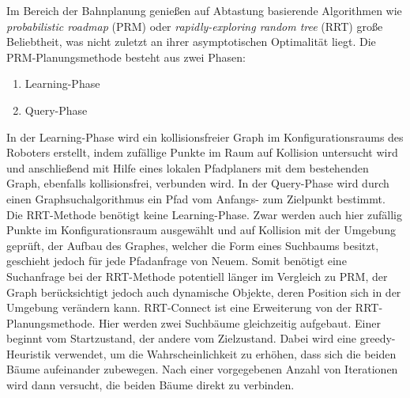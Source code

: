 Im Bereich der Bahnplanung genießen auf Abtastung basierende Algorithmen wie \textit{probabilistic roadmap} (PRM) oder \textit{rapidly-exploring random tree} (RRT) große Beliebtheit, was nicht zuletzt an ihrer asymptotischen Optimalität \cite{SamplingAlgos} liegt.
\newline
Die PRM-Planungsmethode \cite{PRM} besteht aus zwei Phasen:
\begin{enumerate}
	\item Learning-Phase
	\item Query-Phase
\end{enumerate}
In der Learning-Phase wird ein kollisionsfreier Graph im Konfigurationsraums des Roboters erstellt, indem zufällige Punkte im Raum auf Kollision untersucht wird und anschließend mit Hilfe eines lokalen Pfadplaners mit dem bestehenden Graph, ebenfalls kollisionsfrei, verbunden wird. In der Query-Phase wird durch einen Graphsuchalgorithmus ein Pfad vom Anfangs- zum Zielpunkt bestimmt.
\newline
Die RRT-Methode \cite{RRT} benötigt keine Learning-Phase. Zwar werden auch hier zufällig Punkte im Konfigurationsraum ausgewählt und auf Kollision mit der Umgebung geprüft, der Aufbau des Graphes, welcher die Form eines Suchbaums besitzt, geschieht jedoch für jede Pfadanfrage von Neuem. Somit benötigt eine Suchanfrage bei der RRT-Methode potentiell länger im Vergleich zu PRM, der Graph berücksichtigt jedoch auch dynamische Objekte, deren Position sich in der Umgebung verändern kann.
\newline
RRT-Connect \cite{RRTConnect} ist eine Erweiterung von der RRT-Planungsmethode. Hier werden zwei Suchbäume gleichzeitig aufgebaut. Einer beginnt vom Startzustand, der andere vom Zielzustand. Dabei wird eine greedy-Heuristik verwendet, um die Wahrscheinlichkeit zu erhöhen, dass sich die beiden Bäume aufeinander zubewegen. Nach einer vorgegebenen Anzahl von Iterationen wird dann versucht, die beiden Bäume direkt zu verbinden.
